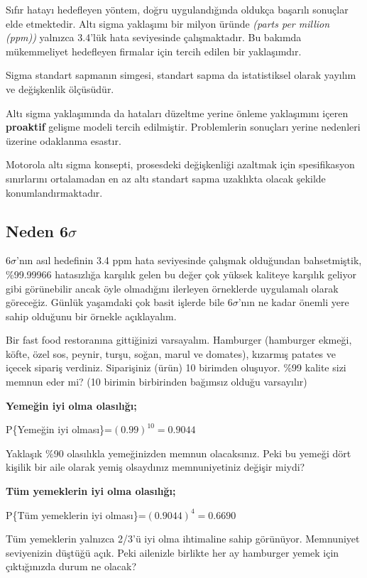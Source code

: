\documentclass[
]{book}
\begin{document}
Sıfır hatayı hedefleyen yöntem, doğru uygulandığında oldukça başarılı sonuçlar elde etmektedir. Altı sigma yaklaşımı bir milyon üründe \emph{(parts per million (ppm))} yalnızca 3.4'lük hata seviyesinde çalışmaktadır. Bu bakımda mükemmeliyet hedefleyen firmalar için tercih edilen bir yaklaşımdır.

Sigma standart sapmanın simgesi, standart sapma da istatistiksel olarak yayılım ve değişkenlik ölçüsüdür.

Altı sigma yaklaşımında da hataları düzeltme yerine önleme yaklaşımını içeren \textbf{proaktif} gelişme modeli tercih edilmiştir. Problemlerin sonuçları yerine nedenleri üzerine odaklanma esastır.

Motorola altı sigma konsepti, prosesdeki değişkenliği azaltmak için spesifikasyon sınırlarını ortalamadan en az altı standart sapma uzaklıkta olacak şekilde konumlandırmaktadır.

\hypertarget{neden-6sigma}{%
\subsection{\texorpdfstring{Neden 6\(\sigma\)}{Neden 6\textbackslash sigma}}\label{neden-6sigma}}

6\(\sigma\)'nın asıl hedefinin 3.4 ppm hata seviyesinde çalışmak olduğundan bahsetmiştik, \%99.99966 hatasızlığa karşılık gelen bu değer çok yüksek kaliteye karşılık geliyor gibi görünebilir ancak öyle olmadığını ilerleyen örneklerde uygulamalı olarak göreceğiz. Günlük yaşamdaki çok basit işlerde bile 6\(\sigma\)'nın ne kadar önemli yere sahip olduğunu bir örnekle açıklayalım.

Bir fast food restoranına gittiğinizi varsayalım. Hamburger (hamburger ekmeği, köfte, özel sos, peynir, turşu, soğan, marul ve domates), kızarmış patates ve içecek sipariş verdiniz. Siparişiniz (ürün) 10 birimden oluşuyor. \%99 kalite sizi memnun eder mi? (10 birimin birbirinden bağımsız olduğu varsayılır)

\textbf{Yemeğin iyi olma olasılığı;}

P\{Yemeğin iyi olması\}=\((0.99)^{10}=0.9044\)

Yaklaşık \%90 olasılıkla yemeğinizden memnun olacaksınız. Peki bu yemeği dört kişilik bir aile olarak yemiş olsaydınız memnuniyetiniz değişir miydi?

\textbf{Tüm yemeklerin iyi olma olasılığı;}

P\{Tüm yemeklerin iyi olması\}=\((0.9044)^{4}=0.6690\)

Tüm yemeklerin yalnızca 2/3'ü iyi olma ihtimaline sahip görünüyor. Memnuniyet seviyenizin düştüğü açık. Peki ailenizle birlikte her ay hamburger yemek için çıktığınızda durum ne olacak?
\end{document}
